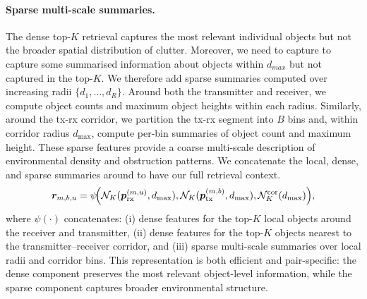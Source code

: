 

\paragraph{Sparse multi-scale summaries.}
The dense top-$K$ retrieval captures the most relevant individual objects but not the broader spatial distribution of clutter. Moreover, we need to capture to capture some summarised information about objects within $d_{max}$ but not captured in the top-$K$.  We therefore add sparse summaries computed over increasing radii $\{d_1,\dots,d_R\}$.  Around both the transmitter and receiver, we compute object counts and maximum object heights within each radius. Similarly, around the tx-rx corridor, we partition the tx-rx segment into $B$ bins and, within corridor radius $d_{\max}$, compute per-bin summaries of object count and maximum height. These sparse features provide a coarse multi-scale description of environmental density and obstruction patterns. We concatenate the local, dense, and sparse summaries around to have our full retrieval context.
\begin{equation}
\boldsymbol{r}_{m,b,u}
=
\psi\!\Big(
\mathcal{N}_{K}(\boldsymbol{p}^{(m,u)}_{\mathrm{rx}}, d_{\max}),
\mathcal{N}_{K}(\boldsymbol{p}^{(m,b)}_{\mathrm{tx}}, d_{\max}),
\mathcal{N}^{\mathrm{cor}}_{K}(d_{\max})
\Big),
\label{eq:retrieval_vector}
\end{equation}
where $\psi(\cdot)$ concatenates: (i) dense features for the top-$K$ local objects around the receiver and transmitter, (ii) dense features for the top-$K$ objects nearest to the transmitter--receiver corridor, and (iii) sparse multi-scale summaries over local radii and corridor bins. This representation is both efficient and pair-specific: the dense component preserves the most relevant object-level information, while the sparse component captures broader environmental structure.


